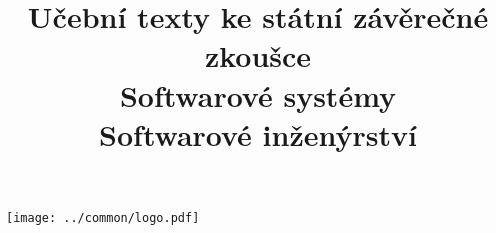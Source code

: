 \clearpage

\clearpage

\title{\LARGE Učební texty ke státní závěrečné zkoušce \\ Softwarové systémy \\ Softwarové inženýrství}




\maketitle

\vspace{10mm}
\begin{center}
\texttt{[image: ../common/logo.pdf]}
\end{center} 

\clearpage

\clearpage

\tableofcontents







